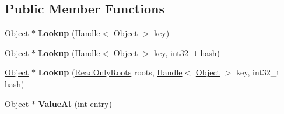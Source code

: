 \subsection*{Public Member Functions}
\begin{DoxyCompactItemize}
\item 
\mbox{\label{classv8_1_1internal_1_1ObjectHashTableBase_a58b1878cac9cb327c09061bed0d08550}} 
\mbox{\hyperlink{classv8_1_1internal_1_1Object}{Object}} $\ast$ {\bfseries Lookup} (\mbox{\hyperlink{classv8_1_1internal_1_1Handle}{Handle}}$<$ \mbox{\hyperlink{classv8_1_1internal_1_1Object}{Object}} $>$ key)
\item 
\mbox{\label{classv8_1_1internal_1_1ObjectHashTableBase_af9e083ac34badf6d6b801f523d93da2f}} 
\mbox{\hyperlink{classv8_1_1internal_1_1Object}{Object}} $\ast$ {\bfseries Lookup} (\mbox{\hyperlink{classv8_1_1internal_1_1Handle}{Handle}}$<$ \mbox{\hyperlink{classv8_1_1internal_1_1Object}{Object}} $>$ key, int32\+\_\+t hash)
\item 
\mbox{\label{classv8_1_1internal_1_1ObjectHashTableBase_a9c99e873438cabbc9f2e34a5c8f01283}} 
\mbox{\hyperlink{classv8_1_1internal_1_1Object}{Object}} $\ast$ {\bfseries Lookup} (\mbox{\hyperlink{classv8_1_1internal_1_1ReadOnlyRoots}{Read\+Only\+Roots}} roots, \mbox{\hyperlink{classv8_1_1internal_1_1Handle}{Handle}}$<$ \mbox{\hyperlink{classv8_1_1internal_1_1Object}{Object}} $>$ key, int32\+\_\+t hash)
\item 
\mbox{\label{classv8_1_1internal_1_1ObjectHashTableBase_a3d2e1b2f9dba2fe7db4714f03499e79e}} 
\mbox{\hyperlink{classv8_1_1internal_1_1Object}{Object}} $\ast$ {\bfseries Value\+At} (\mbox{\hyperlink{classint}{int}} entry)
\end{DoxyCompactItemize}

